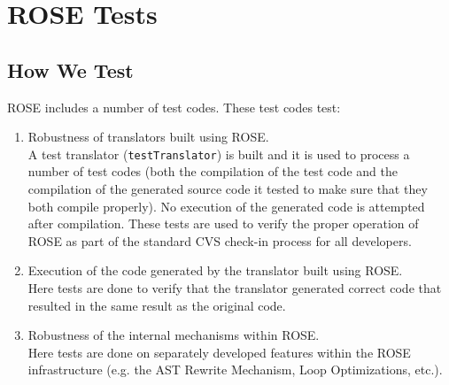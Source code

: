 \chapter{ROSE Tests}

\label{tests:introduction}

\section{How We Test}

ROSE includes a number of test codes. These test codes test:
\begin{enumerate}
   \item Robustness of translators built using ROSE. \\
         A test translator ({\tt testTranslator}) is built and it is used to process a number of
         test codes (both the compilation of the test code and the compilation of
         the generated source code it tested to make sure that they both compile
         properly). No execution of the generated code is attempted after compilation.
         These tests are used to verify the proper operation of ROSE as part of
         the standard CVS check-in process for all developers.

   \item Execution of the code generated by the translator built using ROSE. \\
         Here tests are done to verify that the translator generated correct code
         that resulted in the same result as the original code.  

   \item Robustness of the internal mechanisms within ROSE. \\
         Here tests are done on separately developed features within the ROSE
         infrastructure (e.g. the AST Rewrite Mechanism, Loop Optimizations, etc.).
\end{enumerate}

